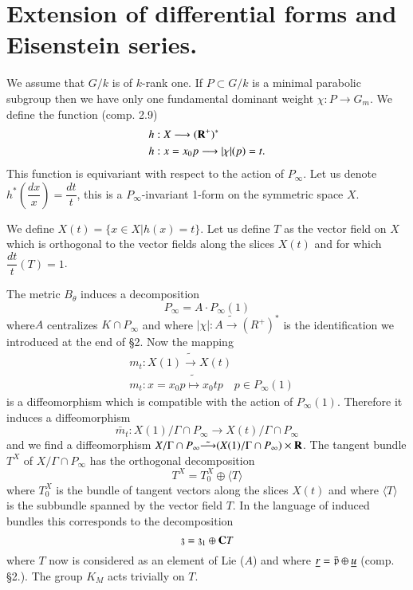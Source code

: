 \section{Extension of differential forms and Eisenstein series.}\label{art5-sec3}
We assume that $G / k$ is of $k$-rank one. If $P\subset G/k$ is a minimal parabolic subgroup then we have only one fundamental dominant weight $\chi: P\longrightarrow G_m$. We define the function (comp. 2.9)
\begin{align*}
& h : X \longrightarrow (\mathbf{R}^+)^\ast\\
& h : x = x_0 p \longrightarrow |\chi|(p) = t.
\end{align*}
This function is equivariant with respect to the action of $P_\infty$. Let us denote $h^\ast \left(\dfrac{dx}{x} \right) = \dfrac{dt}{t}$, this is a $P_\infty$-invariant 1-form on the symmetric space $X$.

We define $X (t) = \{x \in X | h(x) = t\}$. Let us define $T$ as the vector field on $X$ which is orthogonal to the vector fields along the slices $X (t)$ and for which $\dfrac{dt}{t} (T) = 1$.

The metric $B_\theta$ induces a decomposition
$$
P_\infty = A \cdot P_\infty (1)
$$
where\pageoriginale $A$ centralizes $K \cap P_\infty$ and where $|\chi| : A \tilde{\longrightarrow} (R^+)^\ast$ is the identification we introduced at the end of \S 2. Now the mapping
\begin{align*}
& m_t : X(1) \tilde{\longrightarrow} X (t)\\
&  m_t : x = x_0 p \tilde{\longmapsto} x_0 t p \quad p \in P_\infty (1)
\end{align*}
is a diffeomorphism which is compatible with the action of $P_\infty (1)$. Therefore it induces a diffeomorphism
$$
\bar{m}_t : X (1) / \Gamma \cap P_\infty \longrightarrow X (t) / \Gamma \cap P_\infty
$$
and we find a diffeomorphism $X/ \Gamma \cap P_\infty\tilde{\longrightarrow} (X(1)/ \Gamma \cap P_\infty) \times \mathbf{R}$. The tangent bundle $T^X$ of $X / \Gamma \cap P_\infty$ has the orthogonal decomposition 
$$
T^X = T^X_0 \oplus \langle T \rangle
$$
where $T^X_0$ is the bundle of tangent vectors along the slices $X(t)$ and where $\langle T \rangle$ is the subbundle spanned by the vector field $T$. In the language of induced bundles this corresponds to the decomposition
$$
\mathfrak{z} = \mathfrak{z}_1 \oplus \mathbf{C} T
$$
where $T$ now is considered as an element of Lie ($A$) and where $\underline{r} = \bar{\mathfrak{p}} \oplus \underline{u}$ (comp. \S 2.). The group $K_M$ acts trivially on $T$. 

